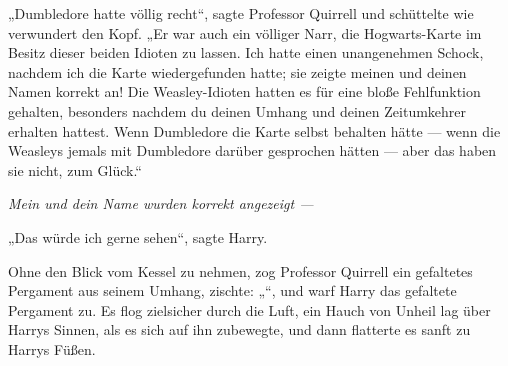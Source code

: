 „Dumbledore hatte völlig recht“, sagte Professor Quirrell und schüttelte wie verwundert den Kopf.
„Er war auch ein völliger Narr, die Hogwarts-Karte im Besitz dieser beiden Idioten zu lassen. Ich hatte einen unangenehmen Schock, nachdem ich die Karte wiedergefunden hatte; sie zeigte meinen und deinen Namen korrekt an! Die Weasley-Idioten hatten es für eine bloße Fehlfunktion gehalten, besonders nachdem du deinen Umhang und deinen Zeitumkehrer erhalten hattest. Wenn Dumbledore die Karte selbst behalten hätte — wenn die Weasleys jemals mit Dumbledore darüber gesprochen hätten — aber das haben sie nicht, zum Glück.“

\emph{Mein und dein Name wurden korrekt angezeigt —}

„Das würde ich gerne sehen“, sagte Harry.

Ohne den Blick vom Kessel zu nehmen, zog Professor Quirrell ein gefaltetes Pergament aus seinem Umhang, zischte:
„“, und warf Harry das gefaltete Pergament zu.
Es flog zielsicher durch die Luft, ein Hauch von Unheil lag über Harrys Sinnen, als es sich auf ihn zubewegte, und dann flatterte es sanft zu Harrys Füßen.

